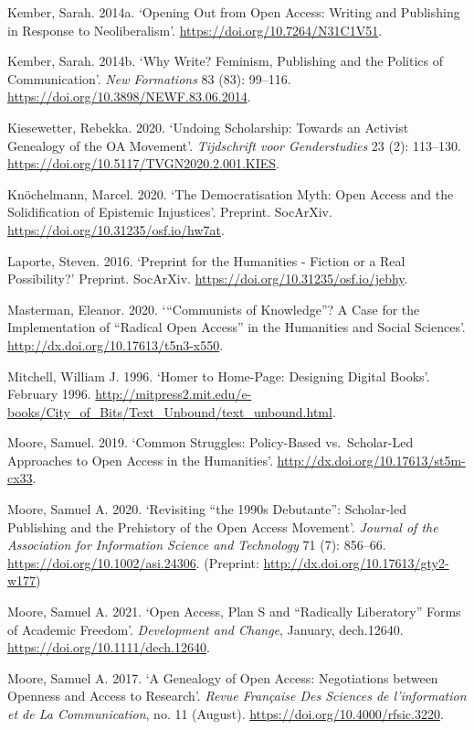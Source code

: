 \documentclass[a4paper,
fontsize=11pt,
oneside,
numbers=noperiodatend,
parskip=half-,
bibliography=totoc,
final
]{scrartcl}
\begin{document}
Kember, Sarah. 2014a. \enquote*{Opening Out from Open Access: Writing
and Publishing in Response to Neoliberalism}.
\url{https://doi.org/10.7264/N31C1V51}.

Kember, Sarah. 2014b. \enquote*{Why Write? Feminism, Publishing and the
Politics of Communication}. \emph{New Formations} 83 (83): 99--116.
\url{https://doi.org/10.3898/NEWF.83.06.2014}.

Kiesewetter, Rebekka. 2020. \enquote*{Undoing Scholarship: Towards an
Activist Genealogy of the OA Movement}. \emph{Tijdschrift voor
Genderstudies} 23 (2): 113--130.
\url{https://doi.org/10.5117/TVGN2020.2.001.KIES}.

Knöchelmann, Marcel. 2020. \enquote*{The Democratisation Myth: Open
Access and the Solidification of Epistemic Injustices}. Preprint.
SocArXiv. \url{https://doi.org/10.31235/osf.io/hw7at}.

Laporte, Steven. 2016. \enquote*{Preprint for the Humanities - Fiction
or a Real Possibility?} Preprint. SocArXiv.
\url{https://doi.org/10.31235/osf.io/jebhy}.

Masterman, Eleanor. 2020. \enquote*{\enquote{Communists of Knowledge}? A Case for the Implementation of \enquote{Radical Open Access} in the Humanities and Social Sciences}.
\url{http://dx.doi.org/10.17613/t5n3-x550}.

Mitchell, William J. 1996. \enquote*{Homer to Home-Page: Designing
Digital Books}. February 1996.
\url{http://mitpress2.mit.edu/e-books/City_of_Bits/Text_Unbound/text_unbound.html}.

Moore, Samuel. 2019. \enquote*{Common Struggles: Policy-Based
vs.~Scholar-Led Approaches to Open Access in the Humanities}.
\url{http://dx.doi.org/10.17613/st5m-cx33}.

Moore, Samuel A. 2020. \enquote*{Revisiting \enquote{the 1990s Debutante}: Scholar-led Publishing and the Prehistory of the Open Access Movement}. \emph{Journal of the Association for Information Science and Technology} 71 (7): 856--66. \url{https://doi.org/10.1002/asi.24306}. (Preprint: \href{https://hcommons.org/deposits/item/hc:24075}{http://dx.doi.org/10.17613/gty2-w177})

Moore, Samuel A. 2021. \enquote*{Open Access, Plan S and
\enquote{Radically Liberatory} Forms of Academic Freedom}.
\emph{Development and Change}, January, dech.12640.
\url{https://doi.org/10.1111/dech.12640}.

Moore, Samuel A. 2017. \enquote*{A Genealogy of Open Access:
Negotiations between Openness and Access to Research}. \emph{Revue
Française Des Sciences de l'information et de La Communication}, no. 11
(August). \url{https://doi.org/10.4000/rfsic.3220}.
\end{document}

